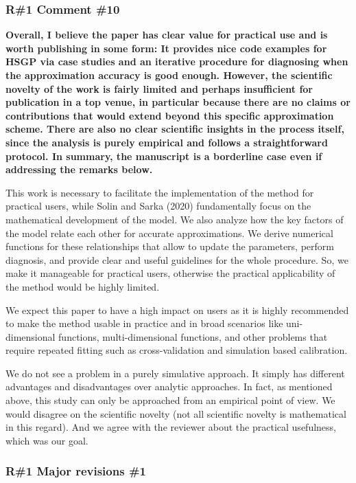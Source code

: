 \documentclass[11pt]{report}
\begin{document}
\subsubsection*{R\#1 Comment \#10}

\textbf{Overall, I believe the paper has clear value for practical use and is worth publishing in some form: It provides nice code examples for HSGP via case studies and an iterative procedure for diagnosing when the approximation accuracy is good enough. However, the scientific novelty of the work is fairly limited and perhaps insufficient for publication in a top venue, in particular because there are no claims or contributions that would extend beyond this specific approximation scheme. There are also no clear scientific insights in the process itself, since the analysis is purely empirical and follows a straightforward protocol. In summary, the manuscript is a borderline case even if addressing the remarks below.}

This work is necessary to facilitate the implementation of the method for practical users, while Solin and Sarka (2020) fundamentally focus on the mathematical development of the model. We also analyze how the key factors of the model relate each other for accurate approximations. We derive numerical functions for these relationships that allow to update the parameters, perform diagnosis, and provide clear and useful guidelines for the whole procedure. So, we make it manageable for practical users, otherwise the practical applicability of the method would be highly limited.

We expect this paper to have a high impact on users as it is highly recommended to make the method usable in practice and in broad scenarios like uni-dimensional functions, multi-dimensional functions, and other problems that require repeated fitting such as cross-validation and simulation based calibration.

We do not see a problem in a purely simulative approach. It simply has different advantages and disadvantages over analytic approaches. In fact, as mentioned above, this study can only be approached from an empirical point of view. We would disagree on the scientific novelty (not all scientific novelty is mathematical in this regard). And we agree with the reviewer about the practical usefulness, which was our goal.

\subsubsection*{R\#1 Major revisions \#1}
\end{document}

